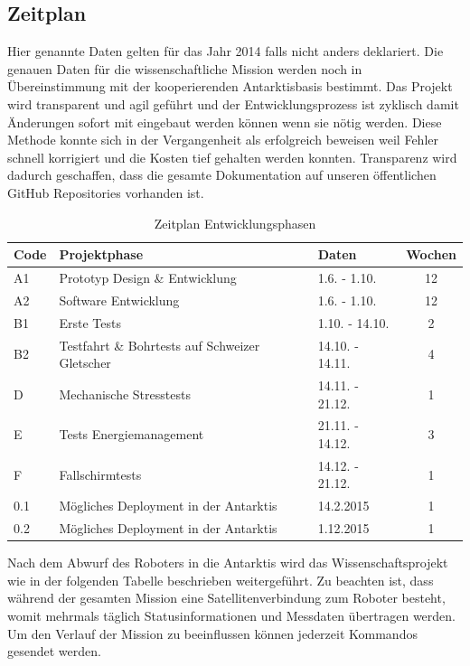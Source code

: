 \documentclass[a4paper,12pt]{article}
\begin{document}
\subsection{Zeitplan}

Hier genannte Daten gelten für das Jahr 2014 falls nicht anders deklariert. Die genauen Daten für die wissenschaftliche Mission werden noch in Übereinstimmung mit der kooperierenden Antarktisbasis bestimmt. Das Projekt wird transparent und agil geführt und der Entwicklungsprozess ist zyklisch damit Änderungen sofort mit eingebaut werden können wenn sie nötig werden. Diese Methode konnte sich in der Vergangenheit als erfolgreich beweisen weil Fehler schnell korrigiert und die Kosten tief gehalten werden konnten. Transparenz wird dadurch geschaffen, dass die gesamte Dokumentation auf unseren öffentlichen GitHub \cite{octanisgithub} Repositories vorhanden ist. %

\begin{table}[h!]
\centering
\begin{tabular}{ l | l | l | c }

\bfseries{Code} & \bfseries{Projektphase} & \bfseries{Daten} & \bfseries{Wochen} \\
\hline
A1 & Prototyp Design \& Entwicklung & 1.6. - 1.10. & 12 \\
A2 & Software Entwicklung & 1.6. - 1.10. & 12 \\
B1 & Erste Tests & 1.10. - 14.10. & 2  \\
B2 & Testfahrt \& Bohrtests auf Schweizer Gletscher & 14.10. - 14.11. & 4 \\
D & Mechanische Stresstests & 14.11. - 21.12. & 1 \\
E & Tests Energiemanagement & 21.11. - 14.12. & 3 \\
F & Fallschirmtests & 14.12. - 21.12. & 1 \\
0.1 & Mögliches Deployment in der Antarktis & 14.2.2015 &  1 \\
0.2 & Mögliches Deployment in der Antarktis & 1.12.2015 &  1 \\

\end{tabular}
\caption{Zeitplan Entwicklungsphasen}
\end{table}

Nach dem Abwurf des Roboters in die Antarktis wird das Wissenschaftsprojekt wie in der folgenden Tabelle beschrieben weitergeführt. Zu beachten ist, dass während der gesamten Mission eine Satellitenverbindung zum Roboter besteht, womit mehrmals täglich Statusinformationen und Messdaten übertragen werden. Um den Verlauf der Mission zu beeinflussen können jederzeit Kommandos gesendet werden.
\end{document}
